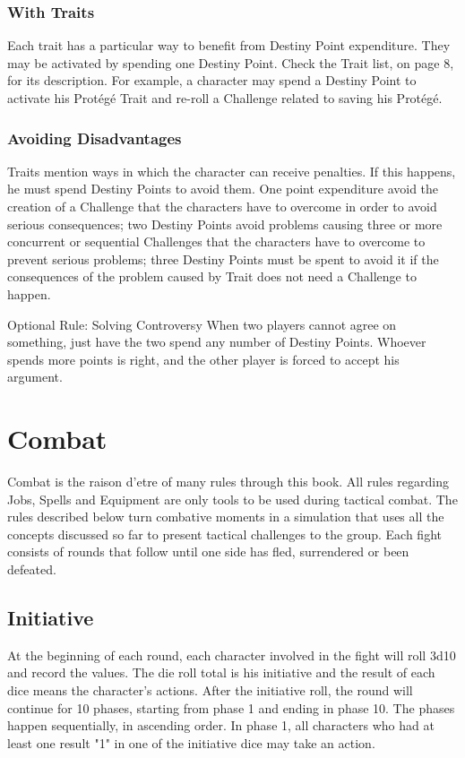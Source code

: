\subsubsection{With Traits}
Each trait has a particular way to benefit
from Destiny Point expenditure. They may be
activated by spending one Destiny Point. Check the
Trait list, on page 8, for its description. For
example, a character may spend a Destiny Point to
activate his Protégé Trait and re-roll a Challenge
related to saving his Protégé.

\subsubsection{Avoiding Disadvantages}
Traits mention ways in which the
character can receive penalties. If this happens, he
must spend Destiny Points to avoid them. One
point expenditure avoid the creation of a
Challenge that the characters have to overcome in
order to avoid serious consequences; two Destiny
Points avoid problems causing three or more
concurrent or sequential Challenges that the
characters have to overcome to prevent serious
problems; three Destiny Points must be spent to
avoid it if the consequences of the problem caused
by Trait does not need a Challenge to happen.

Optional Rule: Solving Controversy
When two players cannot agree on
something, just have the two spend any number
of Destiny Points. Whoever spends more points
is right, and the other player is forced to accept
his argument.

\section{Combat}
Combat is the raison d’etre of many rules
through this book. All rules regarding Jobs, Spells
and Equipment are only tools to be used during
tactical combat. The rules described below turn
combative moments in a simulation that uses all
the concepts discussed so far to present tactical
challenges to the group. Each fight consists of
rounds that follow until one side has fled,
surrendered or been defeated.

\subsection{Initiative}
At the beginning of each round, each
character involved in the fight will roll 3d10 and
record the values. The die roll total is his initiative
and the result of each dice means the character's
actions. After the initiative roll, the round will
continue for 10 phases, starting from phase 1 and
ending in phase 10. The phases happen
sequentially, in ascending order. In phase 1, all
characters who had at least one result "1" in one of
the initiative dice may take an action.

